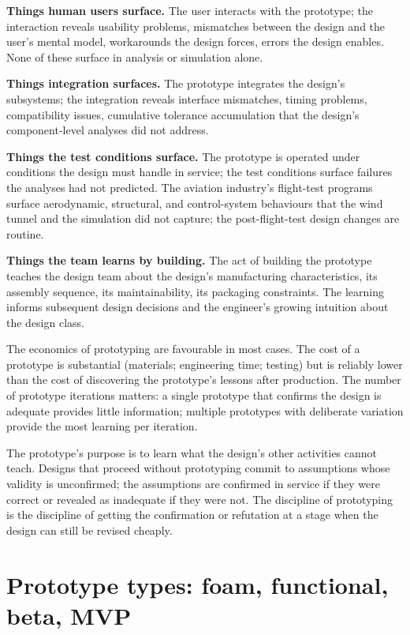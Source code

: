 \textbf{Things human users surface.} The user interacts with the prototype; the interaction reveals usability problems, mismatches between the design and the user's mental model, workarounds the design forces, errors the design enables. None of these surface in analysis or simulation alone.

\textbf{Things integration surfaces.} The prototype integrates the design's subsystems; the integration reveals interface mismatches, timing problems, compatibility issues, cumulative tolerance accumulation that the design's component-level analyses did not address.

\textbf{Things the test conditions surface.} The prototype is operated under conditions the design must handle in service; the test conditions surface failures the analyses had not predicted. The aviation industry's flight-test programs surface aerodynamic, structural, and control-system behaviours that the wind tunnel and the simulation did not capture; the post-flight-test design changes are routine.

\textbf{Things the team learns by building.} The act of building the prototype teaches the design team about the design's manufacturing characteristics, its assembly sequence, its maintainability, its packaging constraints. The learning informs subsequent design decisions and the engineer's growing intuition about the design class.

The economics of prototyping are favourable in most cases. The cost of a prototype is substantial (materials; engineering time; testing) but is reliably lower than the cost of discovering the prototype's lessons after production. The number of prototype iterations matters: a single prototype that confirms the design is adequate provides little information; multiple prototypes with deliberate variation provide the most learning per iteration.

\begin{principle}
The prototype's purpose is to learn what the design's other activities cannot teach. Designs that proceed without prototyping commit to assumptions whose validity is unconfirmed; the assumptions are confirmed in service if they were correct or revealed as inadequate if they were not. The discipline of prototyping is the discipline of getting the confirmation or refutation at a stage when the design can still be revised cheaply.
\end{principle}

\section{Prototype types: foam, functional, beta, MVP}

